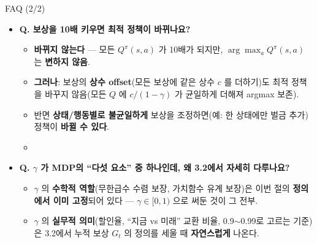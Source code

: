 \documentclass[aspectratio=169,11pt]{beamer}
\begin{document}
\begin{frame}{FAQ (2/2)}
  \begin{itemize}
    \item \textbf{Q. 보상을 10배 키우면 최적 정책이 바뀌나요?}
      \begin{itemize}
        \item \textbf{바뀌지 않는다} --- 모든 $Q^\pi(s,a)$ 가 10배가
          되지만, $\arg\max_a Q^\pi(s,a)$ 는 \textbf{변하지
          않음}.
        \item \textbf{그러나}: 보상의 \textbf{상수 offset}(모든
          보상에 같은 상수 $c$ 를 더하기)도 최적 정책을 바꾸지
          않음(모든 $Q$ 에 $c/(1-\gamma)$ 가 균일하게 더해져
          argmax 보존).
        \item 반면 \textbf{상태/행동별로 불균일하게} 보상을
          조정하면(예: 한 상태에만 벌금 추가) 정책이 \textbf{바뀔
          수 있다}.
        \item {}
      \end{itemize}
    \item \textbf{Q. $\gamma$ 가 MDP의 ``다섯 요소'' 중 하나인데,
      왜 3.2에서 자세히 다루나요?}
      \begin{itemize}
        \item $\gamma$ 의 \textbf{수학적 역할}(무한급수 수렴 보장,
          가치함수 유계 보장)은 이번 절의 \textbf{정의에서 이미
          고정}되어 있다 --- $\gamma \in [0,1)$ 으로 써둔 것이
          그 전부.
        \item $\gamma$ 의 \textbf{실무적 의미}(할인율,
          ``지금 vs 미래'' 교환 비율, 0.9$\sim$0.99로 고르는
          기준)은 3.2에서 누적 보상 $G_t$ 의 정의를 세울 때
          \textbf{자연스럽게} 나온다.
      \end{itemize}
  \end{itemize}
\end{frame}
\end{document}
